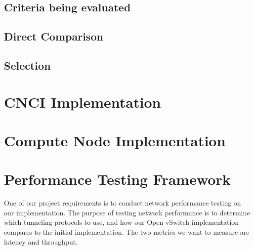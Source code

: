 \documentclass[10pt,letterpaper,onecolumn,draftclsnofoot]{IEEEtran}
\begin{document}
\subsection{Criteria being evaluated}

\subsubsection{}

\subsubsection{}

\subsubsection{}

\subsubsection{}

\subsection{Direct Comparison}

\subsection{Selection}


\section{CNCI Implementation}

\section{Compute Node Implementation}

\section{Performance Testing Framework}
One of our project requirements is to conduct network performance testing on our implementation.
The purpose of testing network performance is to determine which tunneling protocols to use, 
and how our Open vSwitch implementation compares to the initial implementation.
The two metrics we want to measure are latency and throughput.
\end{document}
